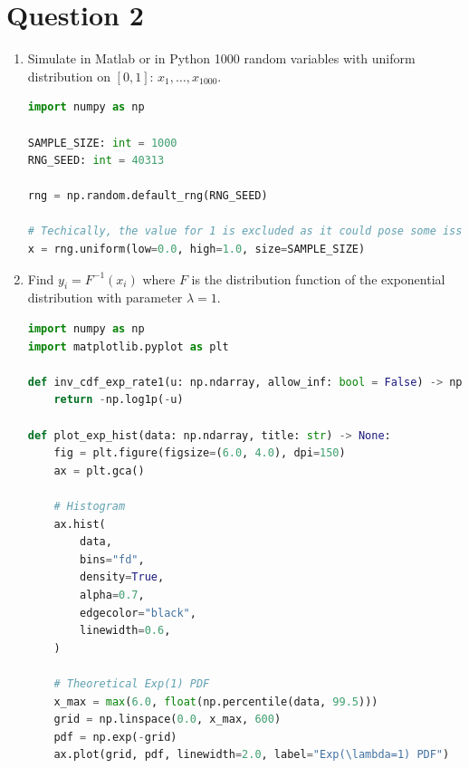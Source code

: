 \documentclass[dvipsnames,11pt]{article}
\begin{document}

\section*{Question 2}

    \begin{enumerate}[label=\alph*.]
        \item Simulate in Matlab or in Python 1000 random variables with uniform distribution on $[0,1]$: $x_1,\dots,x_{1000}$.

            \begin{solution}

\begin{lstlisting}[language=python]
import numpy as np

SAMPLE_SIZE: int = 1000
RNG_SEED: int = 40313

rng = np.random.default_rng(RNG_SEED)

# Techically, the value for 1 is excluded as it could pose some issues when calculating the inverse at point 2 (the function excludes it automatically)
x = rng.uniform(low=0.0, high=1.0, size=SAMPLE_SIZE)
\end{lstlisting}
            
            \end{solution}

\newpage
        
        \item Find $y_i=F^{-1}(x_i)$ where $F$ is the distribution function of the exponential distribution with parameter $\lambda=1$.

            \begin{solution}
    
\begin{lstlisting}[language=python]
import numpy as np
import matplotlib.pyplot as plt

def inv_cdf_exp_rate1(u: np.ndarray, allow_inf: bool = False) -> np.ndarray:
    return -np.log1p(-u)

def plot_exp_hist(data: np.ndarray, title: str) -> None:
    fig = plt.figure(figsize=(6.0, 4.0), dpi=150)
    ax = plt.gca()

    # Histogram
    ax.hist(
        data,
        bins="fd",
        density=True,
        alpha=0.7,
        edgecolor="black",
        linewidth=0.6,
    )

    # Theoretical Exp(1) PDF
    x_max = max(6.0, float(np.percentile(data, 99.5)))
    grid = np.linspace(0.0, x_max, 600)
    pdf = np.exp(-grid)
    ax.plot(grid, pdf, linewidth=2.0, label="Exp(\lambda=1) PDF")


\end{lstlisting}
\end{solution}
\end{enumerate}
\end{document}
